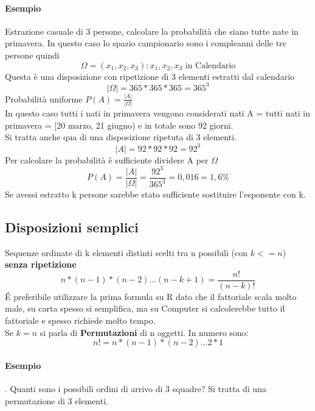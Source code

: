 \paragraph{Esempio} Estrazione casuale di 3 persone, calcolare la probabilità che
siano tutte nate in primavera.
In questo caso lo spazio campionario sono i compleanni delle tre persone quindi
\begin{equation}
    \Omega = {(x_1, x_2, x_3): x_1, x_2, x_3 \text{ in Calendario}}
\end{equation}
Questa è una disposizione con ripetizione di 3 elementi estratti dal calendario
\begin{equation}
    |\Omega| = 365*365*365 = 365^3
\end{equation}
Probabilità uniforme $P(A) = \frac{|A|}{|\Omega|}$
\\ In questo caso tutti i nati in primavera vengono considerati 
nati A = tutti  nati in primavera = [20 marzo, 21 giugno) e in totale sono 92 giorni.
\\ Si tratta anche qua di una disposizione ripetuta di 3 elementi.
\begin{equation}
    |A| = 92*92*92 = 92^3
\end{equation}
Per calcolare la probabilità è sufficiente dividere A per $\Omega$
\begin{equation}
    P(A) = \frac{|A|}{|\Omega|} = \frac{92^3}{365^3} = 0,016 = 1,6\%
\end{equation}
Se avessi estratto k persone sarebbe stato sufficiente sostituire l'esponente con k.

\subsection{Disposizioni semplici}
Sequenze ordinate di k elementi distinti scelti tra n possibili (con $k <= n$) 
\textbf{senza ripetizione}
\begin{equation}
    n*(n-1)*(n-2)\dots(n-k+1) = \frac{n!}{(n-k)!}
\end{equation}
\'E preferibile utilizzare la prima formula su R dato che il fattoriale scala molto male,
su carta spesso si semplifica, ma su Computer si calcolerebbe tutto il fattoriale e spesso richiede 
molto tempo.
\\ Se $k = n$ si parla di \textbf{Permutazioni} di n oggetti. In numero sono:
\begin{equation}
    n! = n*(n-1)*(n-2)\dots 2 * 1
\end{equation}
\paragraph{Esempio}. Quanti sono i possibili ordini di arrivo di 3 squadre?
Si tratta di una permutazione di 3 elementi.
